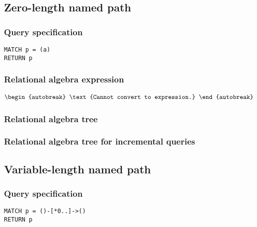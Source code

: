 \subsection{Zero-length named path}

\subsubsection*{Query specification}

\begin{lstlisting}
MATCH p = (a)
RETURN p
\end{lstlisting}

\subsubsection*{Relational algebra expression}

\begin{align*}
\begin{autobreak}
\text{Cannot convert to expression.}
\end{autobreak}
\end{align*}

\subsubsection*{Relational algebra tree}


\subsubsection*{Relational algebra tree for incremental queries}


\subsection{Variable-length named path}

\subsubsection*{Query specification}

\begin{lstlisting}
MATCH p = ()-[*0..]->()
RETURN p
\end{lstlisting}

